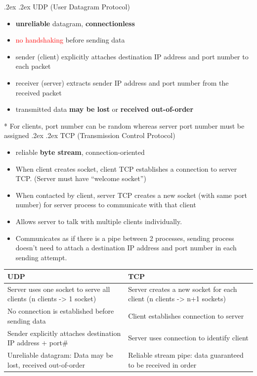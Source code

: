 \documentclass[10pt,landscape,a4paper]{article}
\makeatletter
\renewcommand{\subsection}{\@startsection{subsection}{1}{0mm}%
    {.2ex}%
    {.2ex}%
    {\sffamily\bfseries}}
\makeatother
\begin{document}
\begin{multicols*}{4}
        \subsection{UDP (User Datagram Protocol)}
        \begin{itemize}
            \item \textbf{unreliable} datagram, \textbf{connectionless}
            \item \textcolor{red}{no handshaking} before sending data
            \item sender (client) explicitly attaches destination IP address and port number to {\color{red}each packet}
            \item receiver (server) extracts sender IP address and port number from the received packet
            \item transmitted data \textbf{may be lost} or \textbf{received out-of-order}
        \end{itemize}
        * For clients, port number can be random whereas server port number must be assigned
        \subsection{TCP (Transmission Control Protocol)}
        \begin{itemize}
            \item reliable \textbf{byte stream}, connection-oriented
            \item When client creates socket, client TCP establishes a connection to server TCP. (Server must have ``welcome socket'')
            \item When contacted by client, server TCP creates a {\color{red}new socket} (with same port number) for server process to communicate with that client
            \item Allows server to talk with multiple clients individually.
            \item Communicates as if there is a pipe between 2 processes, sending process doesn't need to attach a destination IP address and port number in each sending attempt.
        \end{itemize}
        \begin{tabularx}{\columnwidth}{|X|X|}
            \hline
            \textbf{UDP} & \textbf{TCP} \\
            \hline
            Server uses {\color{red}one socket} to serve all clients {\tiny (n clients -> 1 socket)} & Server creates a {\color{red}new socket} for each client {\tiny (n clients -> n+1 sockets)}\\
            \hline
            No connection is established before sending data & Client establishes connection to server\\
            \hline
            Sender explicitly attaches {\color{red}destination IP address $+$ port\#} & Server uses {\color{red}connection} to identify client\\
            \hline
            Unreliable datagram: Data may be lost, received out-of-order & Reliable stream pipe: data guaranteed to be received in order\\
            \hline
        \end{tabularx}

\end{multicols*}
\end{document}
